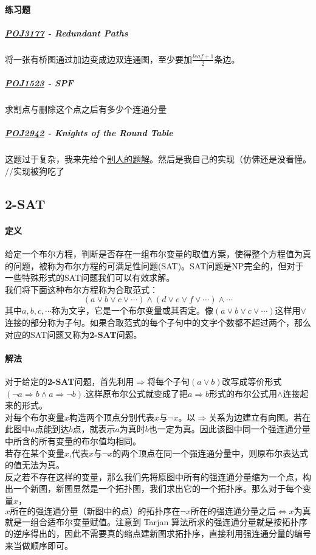 \documentclass[]{cpp}
\begin{document}
\paragraph{练习题}
\subparagraph{\href{http://poj.org/problem?id=3177}{POJ3177} - Redundant Paths}
将一张有桥图通过加边变成边双连通图，至少要加$\frac{leaf+1}{2}$条边。
\subparagraph{\href{http://poj.org/problem?id=1523}{POJ1523} - SPF}
求割点与删除这个点之后有多少个连通分量
\subparagraph{\href{http://poj.org/problem?id=2942}{POJ2942} - Knights of the Round Table}
这题过于复杂，我来先给个\href{http://blog.csdn.net/lyy289065406/article/details/6756821}{别人的题解}。然后是我自己的实现（仿佛还是没看懂。
\\ //实现被狗吃了
\subsection{2-SAT}
\paragraph{定义}
	给定一个布尔方程，判断是否存在一组布尔变量的取值方案，使得整个方程值为真的问题，被称为布尔方程的可满足性问题(SAT)。SAT问题是NP完全的，但对于一些特殊形式的SAT问题我们可以有效求解。\\
	我们将下面这种布尔方程称为合取范式：
	$$(a\lor b\lor c\lor\cdots)\land(d\lor e\lor f\lor\cdots)\land\cdots$$
	其中$a,b,c,\cdots$称为文字，它是一个布尔变量或其否定。像$(a\lor b\lor c\lor\cdots)$这样用$\lor$连接的部分称为子句。如果合取范式的每个子句中的文字个数都不超过两个，那么对应的SAT问题又称为\textbf{2-SAT}问题。
\paragraph{解法}
	对于给定的\textbf{2-SAT}问题，首先利用$\Rightarrow$将每个子句$(a\lor b)$改写成等价形式$(\neg a\Rightarrow b\land a\Rightarrow\neg b)$.这样原布尔公式就变成了把$a\Rightarrow b$形式的布尔公式用$\land$连接起来的形式。\\
	对每个布尔变量$x$构造两个顶点分别代表$x$与$\neg x$。以$\Rightarrow$关系为边建立有向图。若在此图中$a$点能到达$b$点，就表示$a$为真时$b$也一定为真。因此该图中同一个强连通分量中所含的所有变量的布尔值均相同。\\
	若存在某个变量$x$,代表$x$与$\neg x$的两个顶点在同一个强连通分量中，则原布尔表达式的值无法为真。\\
	反之若不存在这样的变量，那么我们先将原图中所有的强连通分量缩为一个点，构出一个新图，新图显然是一个拓扑图，我们求出它的一个拓扑序。那么对于每个变量$x$，\textbf{$$x\text{所在的强连通分量（新图中的点）的拓扑序在}\neg x\text{所在的强连通分量之后}\Leftrightarrow x\text{为真}$$}就是一组合适布尔变量赋值。注意到 Tarjan 算法所求的强连通分量就是按拓扑序的逆序得出的，因此不需要真的缩点建新图求拓扑序，直接利用强连通分量的编号来当做顺序即可。
\end{document}
